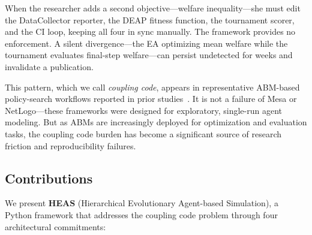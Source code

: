 \documentclass{wscpaperproc}
\begin{document}
When the researcher adds a second objective---welfare inequality---she must edit
the DataCollector reporter, the DEAP fitness function, the tournament scorer, and
the CI loop, keeping all four in sync manually. The framework provides no
enforcement. A silent divergence---the EA optimizing mean welfare while the
tournament evaluates final-step welfare---can persist undetected for weeks and
invalidate a publication.

This pattern, which we call \emph{coupling code}, appears in representative
ABM-based policy-search workflows reported in prior studies~\cite{pangallo2019best,capri2023transport}.
It is not a failure of Mesa or NetLogo---these frameworks were designed for
exploratory, single-run agent modeling. But as ABMs are increasingly deployed
for optimization and evaluation tasks, the coupling code burden has become a
significant source of research friction and reproducibility failures.

\subsection{Contributions}

We present \textbf{HEAS} (Hierarchical Evolutionary Agent-based Simulation),
a Python framework that addresses the coupling code problem through four
architectural commitments:
\end{document}
